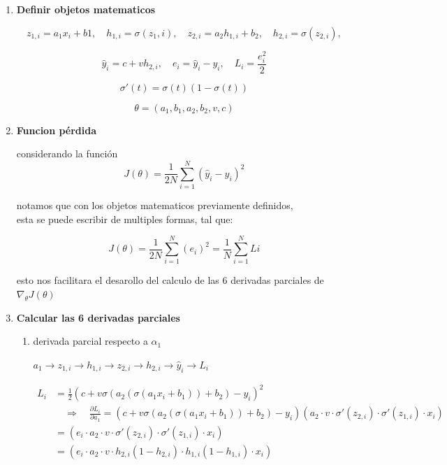 \documentclass{article}
\begin{document}
\begin{enumerate}[label=\roman*]

  \item \textbf{Definir objetos matematicos}

  \[z_{1,i} = a_1x_i+b1, \quad h_{1,i} = \sigma(z_1,i), \quad z_{2,i}=a_2h_{1,i}+b_2, \quad h_{2,i}=\sigma(z_{2,i}),\]

  \[\hat{y}_i=c+vh_{2,i}, \quad e_i=\hat{y}_i-y_i, \quad L_i = \frac{e^2_i}{2}\]

  \[
    \sigma'(t) = \sigma(t)(1- \sigma(t))
    \]

  \[
  \theta = (a_1, b_1, a_2, b_2, v, c)
  \]

  \item \textbf{Funcion pérdida}

  considerando la función
  \[J(\theta) = \frac{1}{2N}\sum_{i=1}^{N}(\hat{y}_i - y_i)^2\]

  notamos que con los objetos matematicos previamente definidos,\\
  esta se puede escribir de multiples formas, tal que:

  \[J(\theta) = \frac{1}{2N}\sum_{i=1}^{N}(e_i)^2 = \frac{1}{N}\sum_{i=1}^{N}Li\]

  esto nos facilitara el desarollo del calculo de las 6 derivadas parciales de $\nabla_\theta J(\theta)$

  \item \textbf{Calcular las 6 derivadas parciales}


  \begin{enumerate}[label=\arabic*.]
    \item derivada parcial respecto a $\alpha_1$
    
    $a_1 \longrightarrow z_{1,i} \longrightarrow h_{1,i}\longrightarrow z_{2,i} \longrightarrow h_{2,i}\longrightarrow \hat{y}_i \longrightarrow L_i$

    \[
    \begin{aligned}
    L_i &= \frac{1}{2}(c+v\sigma(a_2(\sigma(a_1x_i+b_1))+b_2)-y_i)^2\\
    &\quad\Rightarrow\quad
    \frac{\partial L_i}{\partial a_1}
    = (c+v\sigma(a_2(\sigma(a_1x_i+b_1))+b_2)-y_i)
    (a_2\cdot v \cdot \sigma'(z_{2,i}) \cdot \sigma'(z_{1,i}) \cdot x_i)\\
    &= (e_i \cdot a_2\cdot v \cdot \sigma'(z_{2,i}) \cdot \sigma'(z_{1,i}) \cdot x_i)\\
    &= (e_i \cdot a_2\cdot v \cdot h_{2,i}(1 - h_{2,i}) \cdot h_{1,i}(1-h_{1,i}) \cdot x_i)
    \end{aligned}
    \]


\end{enumerate}
\end{enumerate}
\end{document}
